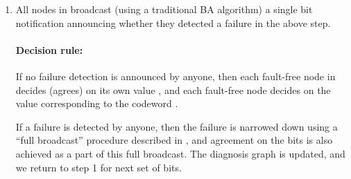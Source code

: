 \documentclass[12pt]{article}
\begin{document}
\begin{enumerate}
\item All nodes in  broadcast (using a traditional BA algorithm)
a single bit notification announcing whether they detected a failure
in the above step.

\paragraph{Decision rule:}
If no failure detection is announced by anyone, then each fault-free node  in 
decides (agrees) on its own value , and each fault-free node  decides
on the value corresponding to the codeword .

If a failure is detected by anyone, then the failure is narrowed down using
a ``full broadcast'' procedure described in \cite{techreport_BA_complexity}, and agreement on the  bits is also achieved
as a part of this full broadcast. The diagnosis graph is updated, and we return
to step 1 for next set of  bits. 

\end{enumerate}
\end{document}
